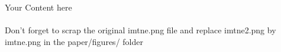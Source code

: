 Your Content here
\\
\\
\cite{de_rosnay_macroscope_1975}
Don't forget to scrap the original imtne.png file and replace imtne2.png by imtne.png in the paper/figures/ folder  